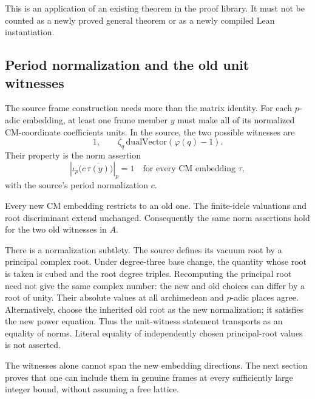 This is an application of an existing theorem in the proof library. It must not be counted as a newly proved general theorem or as a newly compiled Lean instantiation.

\subsection{Period normalization and the old unit witnesses}

The source frame construction needs more than the matrix identity. For each $p$-adic embedding, at least one frame member $y$ must make all of its normalized CM-coordinate coefficients units. In the source, the two possible witnesses are
\begin{equation}\label{eq:unit-witnesses}
 1,\qquad
 \zeta_q\,\mathrm{dualVector}(\varphi(q)-1).
\end{equation}
Their property is the norm assertion
\[
 \left|\iota_p\bigl(c\,\overline{\tau(y)}\bigr)\right|_p=1
 \quad\text{for every CM embedding }\tau,
\]
with the source's period normalization $c$.\cite{shortVectors,tightFrames}

Every new CM embedding restricts to an old one. The finite-idele valuations and root discriminant extend unchanged. Consequently the same norm assertions hold for the two old witnesses in $A$.

There is a normalization subtlety. The source defines its vacuum root by a principal complex root. Under degree-three base change, the quantity whose root is taken is cubed and the root degree triples. Recomputing the principal root need not give the same complex number: the new and old choices can differ by a root of unity. Their absolute values at all archimedean and $p$-adic places agree. Alternatively, choose the inherited old root as the new normalization; it satisfies the new power equation. Thus the unit-witness statement transports as an equality of norms. Literal equality of independently chosen principal-root values is not asserted.

The witnesses alone cannot span the new embedding directions. The next section proves that one can include them in genuine frames at every sufficiently large integer bound, without assuming a free lattice.
